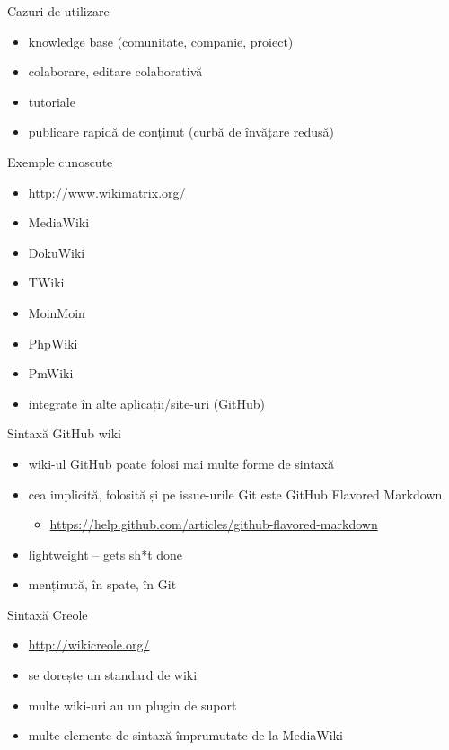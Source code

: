 \documentclass{beamer}
\begin{document}
\begin{frame}{Cazuri de utilizare}
  \begin{itemize}
    \item knowledge base (comunitate, companie, proiect)
    \item colaborare, editare colaborativă
    \item tutoriale
    \item publicare rapidă de conținut (curbă de învățare redusă)
  \end{itemize}
\end{frame}

\begin{frame}{Exemple cunoscute}
  \begin{itemize}
    \item \url{http://www.wikimatrix.org/}
    \item MediaWiki
    \item DokuWiki
    \item TWiki
    \item MoinMoin
    \item PhpWiki
    \item PmWiki
    \item integrate în alte aplicații/site-uri (GitHub)
  \end{itemize}
\end{frame}

\begin{frame}{Sintaxă GitHub wiki}
  \begin{itemize}
    \item wiki-ul GitHub poate folosi mai multe forme de sintaxă
    \item cea implicită, folosită și pe issue-urile Git este GitHub Flavored
      Markdown
      \begin{itemize}
        \item \url{https://help.github.com/articles/github-flavored-markdown}
      \end{itemize}
    \item lightweight -- gets sh*t done
    \item menținută, în spate, în Git
  \end{itemize}
\end{frame}

\begin{frame}{Sintaxă Creole}
  \begin{itemize}
    \item \url{http://wikicreole.org/}
    \item se dorește un standard de wiki
    \item multe wiki-uri au un plugin de suport
    \item multe elemente de sintaxă împrumutate de la MediaWiki
  \end{itemize}
\end{frame}
\end{document}

